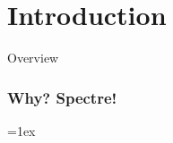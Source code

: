 \documentclass{beamer}
\begin{document}
\section{Introduction}
\begin{frame}{Overview}
  \begin{quotation}
  \tableofcontents
  \end{quotation}
\end{frame}

\begin{frame}
  \frametitle{Why? Spectre!}
  \vss
  {\fboxrule=1ex\fboxsep=0pt}
\end{frame}
\end{document}
